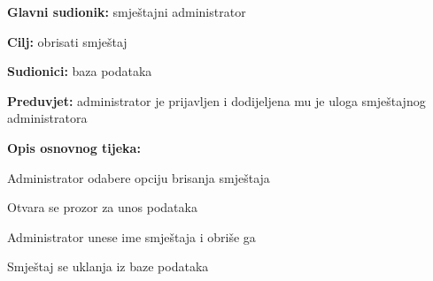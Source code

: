                         \noindent {}
					\begin{packed_item}
	
						\item \textbf{Glavni sudionik: }smještajni administrator
						\item  \textbf{Cilj:} obrisati smještaj
						\item  \textbf{Sudionici:} baza podataka
						\item  \textbf{Preduvjet:} administrator je prijavljen i dodijeljena mu je uloga smještajnog administratora
						\item  \textbf{Opis osnovnog tijeka:}
						
						\item[] \begin{packed_enum}
	
							\item Administrator odabere opciju brisanja smještaja
							\item Otvara se prozor za unos podataka
							\item Administrator unese ime smještaja i obriše ga
							\item Smještaj se uklanja iz baze podataka
						\end{packed_enum}
						
						
					\end{packed_item}


